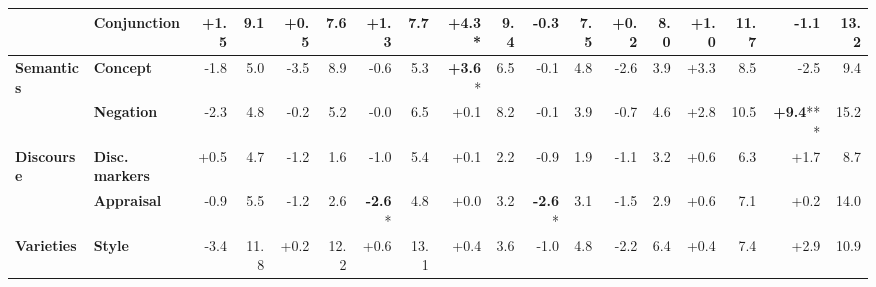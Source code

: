 \begin{table}[h]
{\begin{tabular}{llrrrrrrrrrrrrrrrr}
  & \textbf{Conjunction} & \cellcolor{green!3} +1.5 & \cellcolor{blue!7} 9.1 & \cellcolor{green!1} +0.5 & \cellcolor{blue!6} 7.6 & \cellcolor{green!2} +1.3 & \cellcolor{blue!6} 7.7 & \cellcolor{green!8} \textbf{+4.3}* & \cellcolor{blue!7} 9.4 & \cellcolor{red!0} -0.3 & \cellcolor{blue!6} 7.5 & \cellcolor{green!0} +0.2 & \cellcolor{blue!6} 8.0 & \cellcolor{green!1} +1.0 & \cellcolor{blue!9} 11.7 & \cellcolor{red!2} -1.1 & \cellcolor{blue!10} 13.2 \\
\midrule
\textbf{Semantics} & \textbf{Concept} & \cellcolor{red!3} -1.8 & \cellcolor{blue!3} 5.0 & \cellcolor{red!6} -3.5 & \cellcolor{blue!7} 8.9 & \cellcolor{red!1} -0.6 & \cellcolor{blue!4} 5.3 & \cellcolor{green!7} \textbf{+3.6}* & \cellcolor{blue!5} 6.5 & \cellcolor{red!0} -0.1 & \cellcolor{blue!3} 4.8 & \cellcolor{red!5} -2.6 & \cellcolor{blue!3} 3.9 & \cellcolor{green!6} +3.3 & \cellcolor{blue!6} 8.5 & \cellcolor{red!4} -2.5 & \cellcolor{blue!7} 9.4 \\
  & \textbf{Negation} & \cellcolor{red!4} -2.3 & \cellcolor{blue!3} 4.8 & \cellcolor{red!0} -0.2 & \cellcolor{blue!4} 5.2 & \cellcolor{red!0} -0.0 & \cellcolor{blue!5} 6.5 & \cellcolor{green!0} +0.1 & \cellcolor{blue!6} 8.2 & \cellcolor{red!0} -0.1 & \cellcolor{blue!3} 3.9 & \cellcolor{red!1} -0.7 & \cellcolor{blue!3} 4.6 & \cellcolor{green!5} +2.8 & \cellcolor{blue!8} 10.5 & \cellcolor{green!18} \textbf{+9.4}*** & \cellcolor{blue!12} 15.2 \\
\midrule
\textbf{Discourse} & \textbf{Disc. markers} & \cellcolor{green!1} +0.5 & \cellcolor{blue!3} 4.7 & \cellcolor{red!2} -1.2 & \cellcolor{blue!1} 1.6 & \cellcolor{red!2} -1.0 & \cellcolor{blue!4} 5.4 & \cellcolor{green!0} +0.1 & \cellcolor{blue!1} 2.2 & \cellcolor{red!1} -0.9 & \cellcolor{blue!1} 1.9 & \cellcolor{red!2} -1.1 & \cellcolor{blue!2} 3.2 & \cellcolor{green!1} +0.6 & \cellcolor{blue!5} 6.3 & \cellcolor{green!3} +1.7 & \cellcolor{blue!6} 8.7 \\
  & \textbf{Appraisal} & \cellcolor{red!1} -0.9 & \cellcolor{blue!4} 5.5 & \cellcolor{red!2} -1.2 & \cellcolor{blue!2} 2.6 & \cellcolor{red!5} \textbf{-2.6}* & \cellcolor{blue!3} 4.8 & \cellcolor{green!0} +0.0 & \cellcolor{blue!2} 3.2 & \cellcolor{red!5} \textbf{-2.6}* & \cellcolor{blue!2} 3.1 & \cellcolor{red!3} -1.5 & \cellcolor{blue!2} 2.9 & \cellcolor{green!1} +0.6 & \cellcolor{blue!5} 7.1 & \cellcolor{green!0} +0.2 & \cellcolor{blue!11} 14.0 \\
\midrule
\textbf{Varieties} & \textbf{Style} & \cellcolor{red!6} -3.4 & \cellcolor{blue!9} 11.8 & \cellcolor{green!0} +0.2 & \cellcolor{blue!9} 12.2 & \cellcolor{green!1} +0.6 & \cellcolor{blue!10} 13.1 & \cellcolor{green!0} +0.4 & \cellcolor{blue!2} 3.6 & \cellcolor{red!2} -1.0 & \cellcolor{blue!3} 4.8 & \cellcolor{red!4} -2.2 & \cellcolor{blue!5} 6.4 & \cellcolor{green!0} +0.4 & \cellcolor{blue!5} 7.4 & \cellcolor{green!5} +2.9 & \cellcolor{blue!8} 10.9 \\

\end{tabular}}
\end{table}
